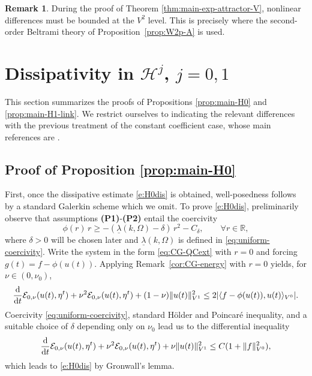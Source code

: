 \documentclass[12pt,leqno]{amsart}
\def\d{{\rm d}}
\def\R {\mathbb{R}}
\theoremstyle{definition}
\newtheorem{remark}[theorem]{Remark}
\numberwithin{equation}{section}
\numberwithin{figure}{section}
\begin{document}
 

 
\begin{remark} \label{rem:beltrami-tools-main}
During the proof of Theorem \ref{thm:main-exp-attractor-V}, 
nonlinear differences must be bounded at the ${V^2}$ level. This is precisely where the second-order Beltrami theory of Proposition~\ref{prop:W2p-A} is used.
 \end{remark}

 
 
 
 
 
 
 
 
 
 
 
 
 
\section{Dissipativity in $\mathcal H^{j}$, $j=0,1$}\label{sec:dissipativity-Hj}
 

This section summarizes the proofs of Propositions \ref{prop:main-H0} and \ref{prop:main-H1-link}.     We restrict ourselves to  indicating the relevant differences with the previous treatment of the  constant coefficient case, whose main references are \cites{CGDP2010,AMN}.

\subsection{Proof of Proposition \ref{prop:main-H0}} First, once the dissipative estimate \eqref{e:H0dis} is   obtained, well-posedness follows by a standard Galerkin scheme which we omit.
To prove \eqref{e:H0dis}, preliminarily observe that assumptions \textbf{(P1)}-\textbf{(P2)} entail the coercivity
\begin{equation}\label{eq:phi-coercivity}
\phi(r)\,r \ge -(\underline\lambda(k,\Omega)-\delta)\,r^2 - C_\delta,
\qquad \forall r\in\R,
\end{equation}
where $\delta>0$ will be chosen later and $\underline\lambda(k,\Omega)$ is defined in \eqref{eq:uniform-coercivity}.
Write the system in the form \eqref{eq:CG-QCext} with $r=0$ and forcing
$g(t)=f-\phi(u(t))$. Applying Remark~\ref{cor:CG-energy} with $r=0$ yields, for $\nu\in(0,\nu_0)$,
\begin{equation}\label{eq:H0-damped-start}
\frac{\d}{\d t}\mathcal E_{0,\nu}(u(t),\eta^t)+\nu^2\mathcal E_{0,\nu}(u(t),\eta^t) + (1-\nu)\|u(t)\|^2_{{V^1}}
\le 2|\langle f-\phi(u(t)),u(t)\rangle_{V^0}|.
\end{equation}
Coercivity \eqref{eq:uniform-coercivity},  standard H\"older and Poincar\'e inequality, and a suitable choice of $\delta$ depending only on $\nu_0$ lead us to the differential inequality 
\[
\frac{\d}{\d t}\mathcal  E_{0,\nu}(u(t),\eta^t)+\nu^2\mathcal E_{0,\nu}(u(t),\eta^t)+\nu  \|u(t)\|^2_{{V^1}} \le C(1+\|f\|_{V^0}^2),
\]
which leads to \eqref{e:H0dis} by Gronwall's lemma.
 
\end{document}
